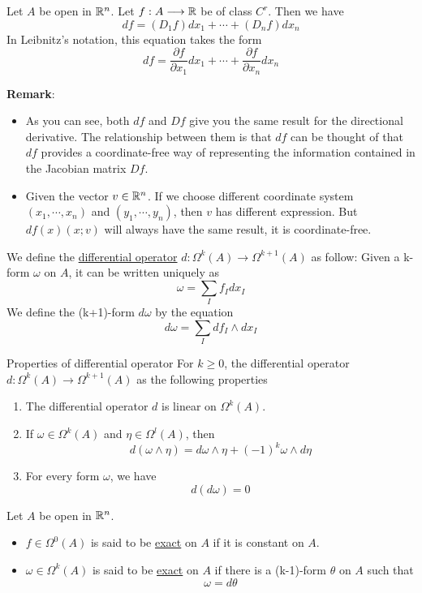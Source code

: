 \begin{theorem}
    Let $A$ be open in $\mathbb{R}^n$. Let $f:A\longrightarrow\mathbb{R}$ be of class $C^r$. Then we have 
    $$df=(D_1f)dx_1+\cdots+(D_nf)dx_n$$
    In Leibnitz's notation, this equation takes the form 
    $$df=\frac{\partial f}{\partial x_1}dx_1+\cdots +\frac{\partial f}{\partial x_n}dx_n$$
\end{theorem}

\noindent\textbf{Remark}:
\begin{itemize}
    \item As you can see, both $df$ and $Df$ give you the same result for the directional derivative. The relationship between them is that $df$ can be thought of that $df$ provides a coordinate-free way of representing the information contained in the Jacobian matrix $Df$.
    \item Given the vector $v\in \mathbb{R}^n$. If we choose different coordinate system $(x_1,\cdots,x_n)$ and $(y_1,\cdots,y_n)$, then $v$ has different expression. But $df(x)(x;v)$ will always have the same result, it is coordinate-free.
\end{itemize}

\begin{definition}
    We define the \underline{differential operator} $d:\Omega^k(A)\longrightarrow\Omega^{k+1}(A)$ as follow: 
    Given a k-form $\omega$ on $A$, it can be written uniquely as $$\omega=\sum_If_Idx_I$$
    We define the (k+1)-form $d\omega$ by the equation $$d\omega=\sum_Idf_I\wedge dx_I$$
\end{definition}

\begin{theorem}{Properties of differential operator}
    For $k\geq0$, the differential operator $d:\Omega^k(A)\longrightarrow\Omega^{k+1}(A)$ as the following properties
    \begin{enumerate}
        \item The differential operator $d$ is linear on $\Omega^k(A)$.
        \item If $\omega\in \Omega^k(A)$ and $\eta\in \Omega^l(A)$, then $$d(\omega\wedge\eta)=d\omega\wedge\eta+(-1)^k\omega\wedge d\eta$$
        \item For every form $\omega$, we have $$d(d\omega)=0$$
    \end{enumerate}
\end{theorem}

\begin{definition}
    Let $A$ be open in $\mathbb{R}^n$.
    \begin{itemize}
        \item $f\in \Omega^0(A)$ is said to be \underline{exact} on $A$ if it is constant on $A$.
        \item $\omega\in\Omega^k(A)$ is said to be \underline{exact} on $A$ if there is a (k-1)-form $\theta$ on $A$ such that $$\omega=d\theta$$
    \end{itemize}
\end{definition}

